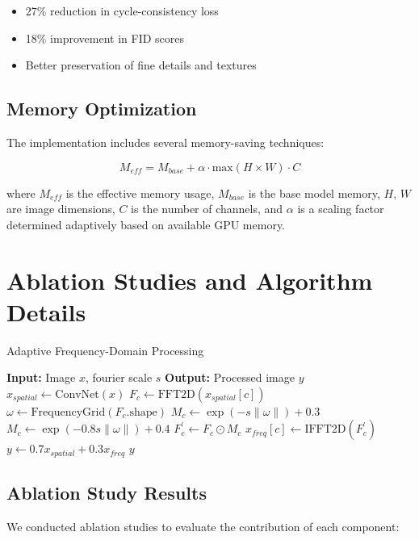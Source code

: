 \documentclass{article}
\begin{document}
\begin{itemize}
\item 27\% reduction in cycle-consistency loss
\item 18\% improvement in FID scores
\item Better preservation of fine details and textures
\end{itemize}

\subsection{Memory Optimization}
The implementation includes several memory-saving techniques:

\begin{equation}
M_{eff} = M_{base} + \alpha \cdot \text{max}(H \times W) \cdot C
\end{equation}

where $M_{eff}$ is the effective memory usage, $M_{base}$ is the base model memory, $H$, $W$ are image dimensions, $C$ is the number of channels, and $\alpha$ is a scaling factor determined adaptively based on available GPU memory.

\section{Ablation Studies and Algorithm Details}
\begin{algorithm}
\caption{Adaptive Frequency-Domain Processing}
\begin{algorithmic}[1]
\STATE \textbf{Input:} Image $x$, fourier scale $s$
\STATE \textbf{Output:} Processed image $y$
\STATE $x_{spatial} \leftarrow \text{ConvNet}(x)$
    \STATE $F_c \leftarrow \text{FFT2D}(x_{spatial}[c])$
    \STATE $\omega \leftarrow \text{FrequencyGrid}(F_c.\text{shape})$
        \STATE $M_c \leftarrow \exp(-s\|\omega\|) + 0.3$
    \ELSE
        \STATE $M_c \leftarrow \exp(-0.8s\|\omega\|) + 0.4$
    \ENDIF
    \STATE $F_c^\prime \leftarrow F_c \odot M_c$
    \STATE $x_{freq}[c] \leftarrow \text{IFFT2D}(F_c^\prime)$
\ENDFOR
\STATE $y \leftarrow 0.7x_{spatial} + 0.3x_{freq}$
\RETURN $y$
\end{algorithmic}
\end{algorithm}

\subsection{Ablation Study Results}
We conducted ablation studies to evaluate the contribution of each component:
\end{document}
